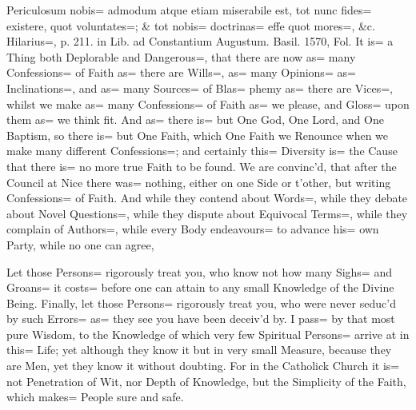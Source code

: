 Periculosum nobis= admodum atque etiam miserabile est, tot nunc fides= existere, quot voluntates=;
\& tot nobis= doctrinas= effe quot mores=, \&c.
Hilarius=, p.
211.
in Lib.
ad Constantium Augustum.
Basil.
1570, Fol.
It is= a Thing both Deplorable and Dangerous=, that there are now as= many Confessions= of Faith as= there are Wills=, as= many Opinions= as= Inclinations=, and as= many Sources= of Blas= phemy as= there are Vices=, whilst we make as= many Confessions= of Faith as= we please, and Gloss= upon them as= we think fit.
And as= there is= but One God, One Lord, and One Baptism, so there is= but One Faith, which One Faith we Renounce when we make many different Confessions=;
and certainly this= Diversity is= the Cause that there is= no more true Faith to be found.
We are convinc'd, that after the Council at Nice there was= nothing, either on one Side or t'other, but writing Confessions= of Faith.
And while they contend about Words=, while they debate about Novel Questions=, while they dispute about Equivocal Terms=, while they complain of Authors=, while every Body endeavours= to advance his= own Party, while no one can agree,

Let those Persons= rigorously treat you, who know not how many Sighs= and Groans= it costs= before one can attain to any small Knowledge of the Divine Being.
Finally, let those Persons= rigorously treat you, who were never seduc'd by such Errors= as= they see you have been deceiv'd by.
I pass= by that most pure Wisdom, to the Knowledge of which very few Spiritual Persons= arrive at in this= Life;
yet although they know it but in very small Measure, because they are Men, yet they know it without doubting.
For in the Catholick Church it is= not Penetration of Wit, nor Depth of Knowledge, but the Simplicity of the Faith, which makes= People sure and safe.

